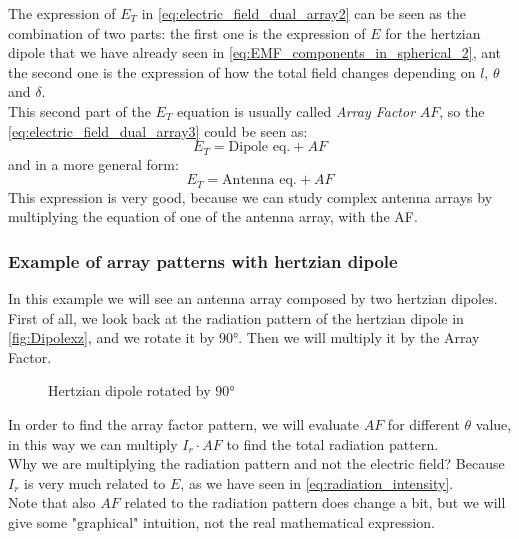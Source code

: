 The expression of $E_T$ in \cref{eq:electric_field_dual_array2} can be seen as the combination of two parts: the first one is the expression of $E$ for the hertzian dipole that we have already seen in \cref{eq:EMF_components_in_spherical_2}, ant the second one is the expression of how the total field changes depending on $l$, $\theta$ and $\delta$.\\
This second part of the $E_T$ equation is usually called \emph{Array Factor} $AF$, so the \cref{eq:electric_field_dual_array3} could be seen as:
\begin{equation}
    E_T=\text{Dipole eq.} + AF
\end{equation}
and in a more general form:
\begin{equation}
    E_T=\text{Antenna eq.} + AF
\end{equation}
This expression is very good, because we can study complex antenna arrays by multiplying the equation of one of the antenna array, with the AF.
\subsubsection*{Example of array patterns with hertzian dipole}
In this example we will see an antenna array composed by two hertzian dipoles.\\
First of all, we look back at the radiation pattern of the hertzian dipole in \cref{fig:Dipolexz}, and we rotate it by $90\si{\degree}$. Then we will multiply it by the Array Factor.
\begin{figure}[H]
    \begin{center}
        \caption{Hertzian dipole rotated by $90\si{\degree}$}\label{fig:Dipolexyrotated}
    \end{center}
\end{figure}
In order to find the array factor pattern, we will evaluate $AF$ for different $\theta$ value, in this way we can multiply $I_r\cdot AF$ to find the total radiation pattern.\\
Why we are multiplying the radiation pattern and not the electric field? Because $I_r$ is very much related to $E$, as we have seen in \cref{eq:radiation_intensity}.\\
Note that also $AF$ related to the radiation pattern does change a bit, but we will give some "graphical" intuition, not the real mathematical expression.
